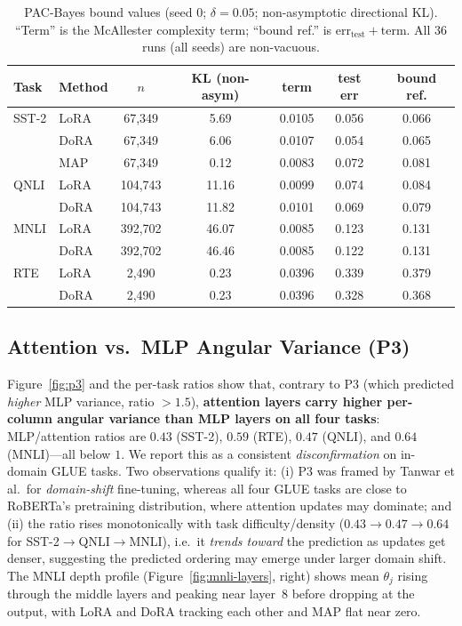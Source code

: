 \documentclass[11pt]{article}
\begin{document}
\begin{table}[t]
\centering
\caption{PAC-Bayes bound values (seed 0; $\delta=0.05$; non-asymptotic directional
KL). ``Term'' is the McAllester complexity term; ``bound ref.'' is
$\mathrm{err}_{\text{test}}+\text{term}$. All $36$ runs (all seeds) are non-vacuous.}
\label{tab:bounds}
\small
\begin{tabular}{llccccc}
\toprule
Task & Method & $n$ & KL (non-asym) & term & test err & bound ref. \\
\midrule
SST-2 & LoRA & 67{,}349  & 5.69  & 0.0105 & 0.056 & 0.066 \\
      & DoRA & 67{,}349  & 6.06  & 0.0107 & 0.054 & 0.065 \\
      & MAP  & 67{,}349  & 0.12  & 0.0083 & 0.072 & 0.081 \\
QNLI  & LoRA & 104{,}743 & 11.16 & 0.0099 & 0.074 & 0.084 \\
      & DoRA & 104{,}743 & 11.82 & 0.0101 & 0.069 & 0.079 \\
MNLI  & LoRA & 392{,}702 & 46.07 & 0.0085 & 0.123 & 0.131 \\
      & DoRA & 392{,}702 & 46.46 & 0.0085 & 0.122 & 0.131 \\
RTE   & LoRA & 2{,}490   & 0.23  & 0.0396 & 0.339 & 0.379 \\
      & DoRA & 2{,}490   & 0.23  & 0.0396 & 0.328 & 0.368 \\
\bottomrule
\end{tabular}
\end{table}

\subsection{Attention vs.\ MLP Angular Variance (P3)}
Figure~\ref{fig:p3} and the per-task ratios show that, contrary to P3 (which predicted
\emph{higher} MLP variance, ratio $>1.5$), \textbf{attention layers carry higher
per-column angular variance than MLP layers on all four tasks}: MLP/attention ratios
are $0.43$ (SST-2), $0.59$ (RTE), $0.47$ (QNLI), and $0.64$ (MNLI)---all below $1$.
We report this as a consistent \emph{disconfirmation} on in-domain GLUE tasks. Two
observations qualify it: (i) P3 was framed by Tanwar et al.\ for \emph{domain-shift}
fine-tuning, whereas all four GLUE tasks are close to RoBERTa's pretraining
distribution, where attention updates may dominate; and (ii) the ratio rises
monotonically with task difficulty/density ($0.43\to0.47\to0.64$ for
SST-2$\to$QNLI$\to$MNLI), i.e.\ it \emph{trends toward} the prediction as updates get
denser, suggesting the predicted ordering may emerge under larger domain shift. The
MNLI depth profile (Figure~\ref{fig:mnli-layers}, right) shows mean $\theta_j$ rising
through the middle layers and peaking near layer~8 before dropping at the output, with
LoRA and DoRA tracking each other and MAP flat near zero.
\end{document}
